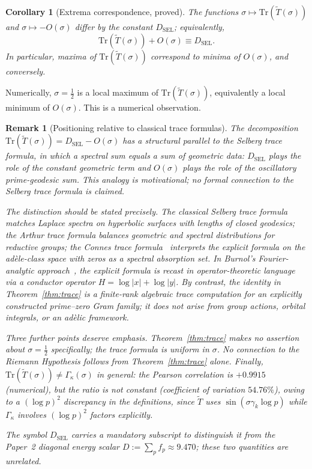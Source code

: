 \documentclass[11pt]{article}
\newtheorem{corollary}[theorem]{Corollary}
\newtheorem*{remark}{Remark}
\newcommand{\Tt}{\widetilde{T}}
\newcommand{\DSEL}{D_{\mathrm{SEL}}}
\begin{document}
\begin{corollary}[Extrema correspondence, proved]
\label{cor:extrema}
The functions $\sigma\mapsto\mathrm{Tr}(\Tt(\sigma))$ and
$\sigma\mapsto -O(\sigma)$ differ by the constant $\DSEL$;
equivalently,
\[
  \mathrm{Tr}(\Tt(\sigma)) + O(\sigma) \equiv \DSEL.
\]
In particular, maxima of $\mathrm{Tr}(\Tt(\sigma))$ correspond to
minima of $O(\sigma)$, and conversely.
\end{corollary}

Numerically, $\sigma=\tfrac{1}{2}$ is a local maximum of
$\mathrm{Tr}(\Tt(\sigma))$, equivalently a local minimum of $O(\sigma)$.
This is a numerical observation.

\begin{remark}[Positioning relative to classical trace formulas]
The decomposition $\mathrm{Tr}(\Tt(\sigma))=\DSEL-O(\sigma)$
has a structural parallel to the Selberg trace formula,
in which a spectral sum equals a sum of geometric data:
$\DSEL$ plays the role of the constant geometric term and
$O(\sigma)$ plays the role of the oscillatory prime-geodesic sum.
This analogy is motivational; no formal connection to the
Selberg trace formula is claimed.

The distinction should be stated precisely.
The classical Selberg trace formula matches Laplace spectra on
hyperbolic surfaces with lengths of closed geodesics; the Arthur
trace formula balances geometric and spectral distributions for
reductive groups; the Connes trace formula~\cite{Connes}
interprets the explicit formula on the ad\`ele-class space with
zeros as a spectral absorption set.
In Burnol's Fourier-analytic approach~\cite{Burnol}, the explicit
formula is recast in operator-theoretic language via a conductor
operator $H=\log|x|+\log|y|$.
By contrast, the identity in Theorem~\ref{thm:trace} is a
finite-rank algebraic trace computation for an explicitly
constructed prime--zero Gram family; it does not arise from
group actions, orbital integrals, or an ad\`elic framework.

Three further points deserve emphasis.
Theorem~\ref{thm:trace} makes no assertion about $\sigma=\tfrac{1}{2}$
specifically; the trace formula is uniform in $\sigma$.
No connection to the Riemann Hypothesis follows from
Theorem~\ref{thm:trace} alone.
Finally, $\mathrm{Tr}(\Tt(\sigma))\neq\Gamma_\kappa(\sigma)$ in general:
the Pearson correlation is $+0.9915$ (numerical), but the ratio is not
constant (coefficient of variation $54.76\%$), owing to a $(\log p)^2$
discrepancy in the definitions, since $\Tt$ uses $\sin(\sigma\gamma_k\log p)$
while $\Gamma_\kappa$ involves $(\log p)^2$ factors explicitly.

The symbol $\DSEL$ carries a mandatory subscript to distinguish it
from the Paper~2 diagonal energy scalar
$D:=\sum_p f_p\approx 9.470$; these two quantities are unrelated.
\end{remark}
\end{document}
